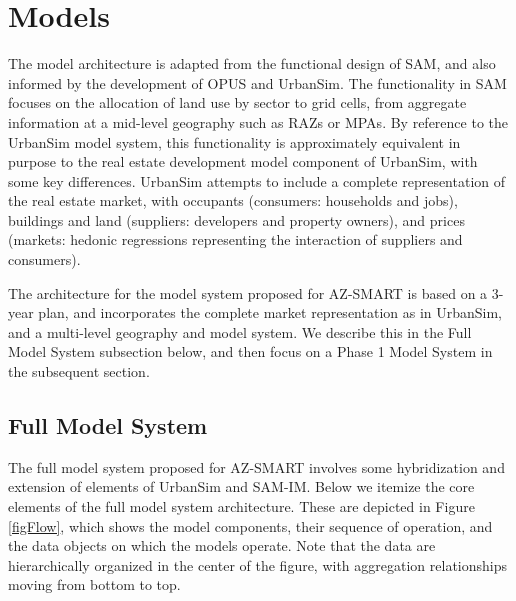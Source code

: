 \section{Models}

The model architecture is adapted from the functional design of SAM,
and also informed by the development of OPUS and UrbanSim. The
functionality in SAM focuses on the allocation of land use by
sector to grid cells, from aggregate information at a mid-level
geography such as RAZs or MPAs.  By reference to the UrbanSim model system,
this functionality is approximately equivalent in purpose to the
real estate development model component of UrbanSim, with some key
differences.  UrbanSim attempts to include a complete representation
of the real estate market, with occupants (consumers: households
and jobs), buildings and land (suppliers: developers and property
owners), and prices (markets: hedonic regressions representing the
interaction of suppliers and consumers).

The architecture for the model system proposed for AZ-SMART is based
on a 3-year plan, and incorporates the complete market
representation as in UrbanSim, and a multi-level geography and model
system.  We describe this in the Full Model System subsection below,
and then focus on a Phase 1 Model System in the subsequent section.

\subsection{Full Model System}
The full model system proposed for AZ-SMART involves some
hybridization and extension of elements of UrbanSim and SAM-IM.
Below we itemize the core elements of the full model system
architecture.  These are depicted in Figure \ref{figFlow}, which
shows the model components, their sequence of operation, and the
data objects on which the models operate.  Note that the data are
hierarchically organized in the center of the figure, with
aggregation relationships moving from bottom to top.


